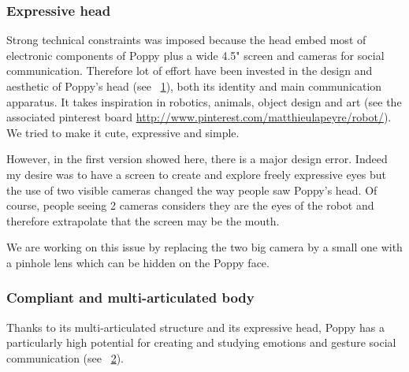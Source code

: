 \subsubsection{Expressive head} %
Strong technical constraints was imposed because the head embed most of electronic components of Poppy plus a wide 4.5" screen and cameras for social communication. Therefore lot of effort have been invested in the design and aesthetic of Poppy's head (see \figurename~\ref{fig:poppy_beta_head}), both its identity and main communication apparatus. It takes inspiration in robotics, animals, object design and art (see the associated pinterest board \url{http://www.pinterest.com/matthieulapeyre/robot/}). We tried to make it cute, expressive and simple.

\begin{figure}[]
\centering
    \hfil
    \caption{}
    \label{fig:poppy_beta_head}
\end{figure}

However, in the first version showed here, there is a major design error. Indeed my desire was to have a screen to create and explore freely expressive eyes but the use of two visible cameras changed the way people saw Poppy's head. Of course, people seeing 2 cameras considers they are the eyes of the robot and therefore extrapolate that the screen may be the mouth.

We are working on this issue by replacing the two big camera by a small one with a pinhole lens which can be hidden on the Poppy face.


\subsubsection{Compliant and multi-articulated body} %

Thanks to its multi-articulated structure and its expressive head, Poppy has a particularly high potential for creating and studying emotions and gesture social communication (see \figurename~\ref{fig:TER_cognitic}).

\begin{figure}[]
\centering
    \hfil
    \\
    \hfil
    \caption{}
    \label{fig:TER_cognitic}
\end{figure}






